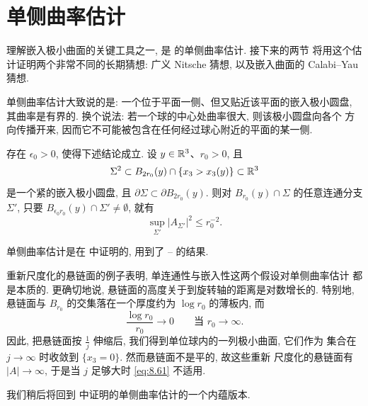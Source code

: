 \section{单侧曲率估计}
\label{sec:8.2}

理解嵌入极小曲面的关键工具之一, 是 \cite{CM6} 的单侧曲率估计. 接下来的两节
将用这个估计证明两个非常不同的长期猜想: 广义 Nitsche 猜想, 以及嵌入曲面的
Calabi--Yau 猜想.

单侧曲率估计大致说的是: 一个位于平面一侧、但又贴近该平面的嵌入极小圆盘,
其曲率是有界的. 换个说法: 若一个球的中心处曲率很大, 则该极小圆盘向各个
方向传播开来, 因而它不可能被包含在任何经过球心附近的平面的某一侧.

\begin{theorem}
\label{thm:8.9}
存在 $\epsilon_0>0$, 使得下述结论成立. 设 $y\in\mathbb{R}^3$、$r_0>0$, 且
\begin{equation}
\Sigma^2\subset B_{2r_0}(y)\cap\{x_3>x_3(y)\}\subset\mathbb{R}^3
\label{eq:8.60}
\end{equation}
是一个紧的嵌入极小圆盘, 且 $\partial\Sigma\subset\partial B_{2r_0}(y)$. 则对
$B_{r_0}(y)\cap\Sigma$ 的任意连通分支 $\Sigma'$, 只要
$B_{\epsilon_0r_0}(y)\cap\Sigma'\neq\emptyset$, 就有
\begin{equation}
\sup_{\Sigma'}|A_{\Sigma'}|^2\leq r_0^{-2}.
\label{eq:8.61}
\end{equation}
\end{theorem}

单侧曲率估计是在 \cite{CM6} 中证明的, 用到了 \cite{CM3}--\cite{CM6} 的结果.


重新尺度化的悬链面的例子表明, 单连通性与嵌入性这两个假设对单侧曲率估计
都是本质的. 更确切地说, 悬链面的高度关于到旋转轴的距离是对数增长的.
特别地, 悬链面与 $B_{r_0}$ 的交集落在一个厚度约为 $\log r_0$ 的薄板内, 而
\begin{equation}
\frac{\log r_0}{r_0}\longrightarrow0\qquad\text{当 } r_0\to\infty.
\label{eq:8.62}
\end{equation}
因此, 把悬链面按 $\frac1j$ 伸缩后, 我们得到单位球内的一列极小曲面, 它们作为
集合在 $j\to\infty$ 时收敛到 $\{x_3=0\}$. 然而悬链面不是平的, 故这些重新
尺度化的悬链面有 $|A|\to\infty$, 于是当 $j$ 足够大时 \eqref{eq:8.61} 不适用.

我们稍后将回到 \cite{CM24} 中证明的单侧曲率估计的一个内蕴版本.

